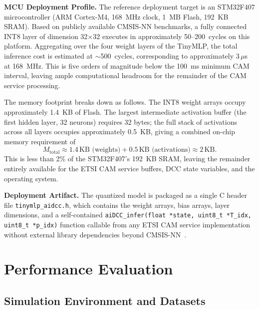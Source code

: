 \documentclass[journal]{IEEEtran}
\begin{document}
\textbf{MCU Deployment Profile.}
The reference deployment target is an STM32F407 microcontroller
(ARM Cortex-M4, 168~MHz clock, 1~MB Flash, 192~KB SRAM).
Based on publicly available CMSIS-NN benchmarks, a fully connected
INT8 layer of dimension 32$\times$32 executes in approximately
50--200~cycles on this platform.  Aggregating over the four
weight layers of the TinyMLP, the total inference cost is
estimated at $\sim$500~cycles, corresponding to approximately
$3\,\mu$s at 168~MHz.  This is five orders of magnitude below
the 100~ms minimum CAM interval, leaving ample computational
headroom for the remainder of the CAM service processing.

The memory footprint breaks down as follows.  The INT8 weight
arrays occupy approximately 1.4~KB of Flash.  The largest
intermediate activation buffer (the first hidden layer, 32
neurons) requires 32 bytes; the full stack of activations
across all layers occupies approximately 0.5~KB, giving a
combined on-chip memory requirement of
\begin{equation}
  M_{\text{total}}
  \approx 1.4\,\text{KB (weights)}
  + 0.5\,\text{KB (activations)}
  \approx 2\,\text{KB}.
  \label{eq:memory}
\end{equation}
This is less than 2\% of the STM32F407's 192~KB SRAM, leaving
the remainder entirely available for the ETSI CAM service buffers,
DCC state variables, and the operating system.

\textbf{Deployment Artifact.}
The quantized model is packaged as a single C header file
\texttt{tinymlp\_aidcc.h}, which contains the weight arrays,
bias arrays, layer dimensions, and a self-contained
\texttt{aiDCC\_infer(float *state, uint8\_t *T\_idx,
uint8\_t *p\_idx)} function callable from any ETSI CAM service
implementation without external library dependencies beyond
CMSIS-NN~\cite{Zila2026}.


\section{Performance Evaluation}
\label{sec.s}

\subsection{Simulation Environment and Datasets}
\label{sec.s0}
\end{document}
